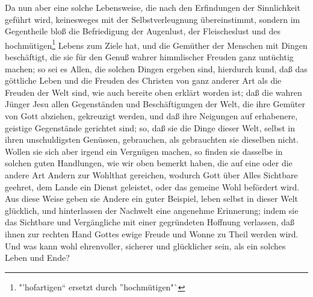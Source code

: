 Da nun aber eine solche Lebensweise, die nach den Erfindungen der Sinnlichkeit
geführt wird, keinesweges mit der Selbstverleugnung übereinstimmt, sondern im
Gegentheile bloß die Befriedigung der Augenlust, der Fleischeslust und des
hochmütigen\footnote{"'hofartigen"` ersetzt durch "'hochmütigen"`} Lebens zum Ziele hat, und die Gemüther der Menschen mit Dingen
beschäftigt, die sie für den Genuß wahrer himmlischer Freuden ganz untüchtig
machen; so sei es Allen, die solchen Dingen ergeben sind, hierdurch kund, daß
das göttliche Leben und die Freuden des Christen von ganz anderer Art als die
Freuden der Welt sind, wie auch bereite oben erklärt worden ist; daß die wahren
Jünger Jesu allen Gegenständen und Beschäftigungen der Welt, die ihre Gemüter
von Gott abziehen, gekreuzigt werden, und daß ihre Neigungen auf erhabenere,
geistige Gegenstände gerichtet sind; so, daß sie die Dinge dieser Welt, selbst
in ihren unschuldigsten Genüssen, gebrauchen, als gebrauchten sie dieselben
nicht. Wollen sie sich aber irgend ein Vergnügen machen, so finden sie dasselbe
in solchen guten Handlungen, wie wir oben bemerkt haben, die auf eine oder die
andere Art Andern zur Wohlthat gereichen, wodurch Gott über Alles Sichtbare
geehret, dem Lande ein Dienst geleistet, oder das gemeine Wohl befördert wird.
Aus diese Weise geben sie Andere ein guter Beispiel, leben selbst in dieser Welt
glücklich, und hinterlassen der Nachwelt eine angenehme Erinnerung; indem sie
das Sichtbare und Vergängliche mit einer gegründeten Hoffnung verlassen, daß
ihnen zur rechten Hand Gottes ewige Freude und Wonne zu Theil werden wird. Und
was kann wohl ehrenvoller, sicherer und glücklicher sein, als ein solches Leben
und Ende?
